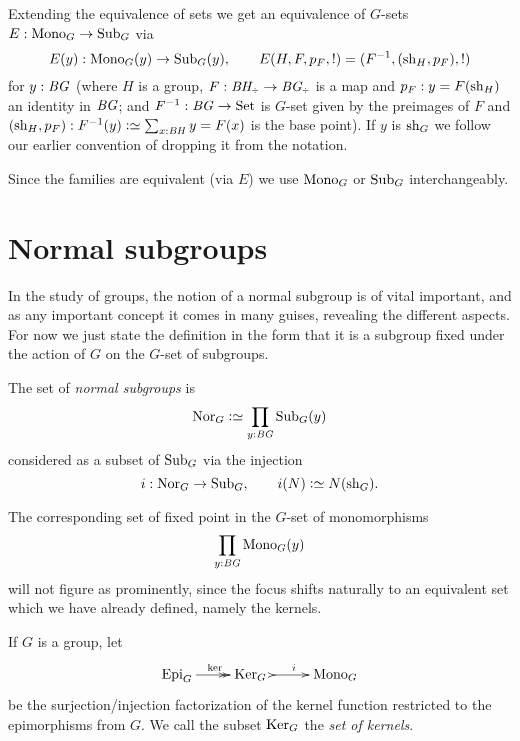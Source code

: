 Extending the equivalence of sets we get an equivalence of $G$-sets $E:\mathrm{Mono}_G\to\mathrm{Sub}_G$ via
$$E(y):\mathrm{Mono}_G(y)\to\mathrm{Sub}_G(y),\qquad E(H,F,p_F,!)=(F^{-1}, (\mathrm{sh}_H,p_F),!)
$$
for $y:\mathit{B}\mathit{G}$ (where $H$ is a group, $F:\BH_\div\to \BG_\div$ is a map and $p_F:y=F(\mathrm{sh}_H)$ an identity in $\mathit{B}\mathit{G}$; and $F^{-1}:\mathit{B}\mathit{G}\to\mathrm{Set}$ is $G$-set given by the preimages of $F$ and $(\shape_H,p_F):F^{-1}(y)\defequi \sum_{x:\BH}y=F(x)$ is the base point).  If $y$ is $\mathrm{sh}_G$ we follow our earlier convention of dropping it from the notation.


Since the families are equivalent (via $E$) we use $\mathrm{Mono}_G$ or $\mathrm{Sub}_G$ interchangeably.

\section{Normal subgroups}
\label{sec:normal}
In the study of groups, the notion of a normal subgroup is of vital important, and as any important concept it comes in many guises, revealing the different aspects.
For now we just state the definition in the form that it is a subgroup fixed under the action of $G$ on the $G$-set of subgroups.
\begin{definition}
  \label{def:normalsubgroup}
  The set of \emph{normal subgroups} is
  $$\typenormal_G\defequi\prod_{y:\BG}\typesubgroup_G(y)$$
  considered as a subset of $\mathrm{Sub}_G$ via the injection
  $$i:\typenormal_G\to\typesubgroup_G,\qquad i(N)\defequi N(\shape_G).$$
\end{definition}

  The corresponding set of fixed point in the $G$-set of monomorphisms
  $$\prod_{y:\mathit{B}\mathit{G}}\mathrm{Mono}_G(y)$$
will not figure as prominently, since the focus shifts naturally to an equivalent set which we have already defined, namely the kernels.
  \begin{definition}
    \label{def:setofkernels}
    If $G$ is a group, let
    $$\xymatrix{\typeepi_G\ar@{->>}[r]^{\ker}&\typekernel_G\,\,\ar@{>->}[r]^i&\typemono_G}$$
    be the surjection/injection factorization of the kernel function restricted to the epimorphisms from $G$.  We call the subset ${\mathrm{Ker}}_G$ the \emph{set of kernels}.
  \end{definition}


